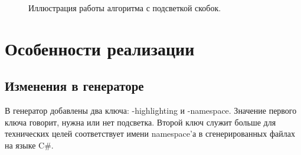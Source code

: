 \begin{figure}[t]
    \centering
    \qquad \qquad \qquad
    \caption{Иллюстрация работы алгоритма с подсветкой скобок.}
    \label{ex}
\end{figure}

\section{Особенности реализации}
\subsection{Изменения в генераторе}

В генератор добавлены два ключа: -highlighting и -namespace. Значение первого ключа говорит, нужна или нет подсветка. Второй ключ служит больше для технических целей соответствует имени namespace’а в сгенерированных файлах на языке C\#.

